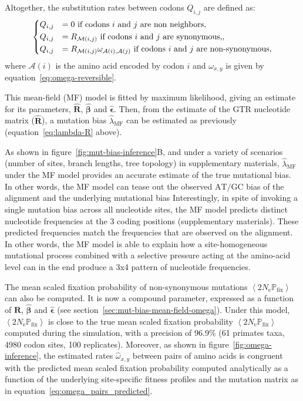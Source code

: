 \documentclass{article}
\newcommand{\UniDimArray}[1]{\bm{#1}}
\newcommand{\BiDimArray}[1]{\bm{#1}}
\newcommand{\Ne}{N_{\text{e}}}
\newcommand{\proba}{\mathbb{P}}
\newcommand{\Pfix}{2 \Ne \proba_{\text{fix}}}
\newcommand{\atgc}{\text{AT/GC}}
\newcommand{\mutmatrix}{R}
\newcommand{\Mutmatrix}{\BiDimArray{\mutmatrix}}
\newcommand{\ci}{{i}}
\newcommand{\cj}{{j}}
\newcommand{\itoj}{\ci, \cj}
\newcommand{\nuc}{\mathcal{M}}
\newcommand{\nucitoj}{\nuc(\itoj)}
\newcommand{\submatrix}{Q}
\newcommand{\aaSource}{x}
\newcommand{\aaTarget}{y}
\newcommand{\aaMap}{\mathcal{A}}
\newcommand{\aai}{\aaMap(\ci)}
\newcommand{\aaj}{\aaMap(\cj)}
\newcommand{\avgpfix}{\left\langle \Pfix \right\rangle }
\newcommand{\AAexchan}{\beta}
\newcommand{\AAExchan}{\UniDimArray{\AAexchan}}
\newcommand{\AAequi}{\epsilon}
\newcommand{\AAEqui}{\UniDimArray{\AAequi}}
\begin{document}
Altogether, the {substitution} rates between codons $\submatrix_{\itoj}$ are defined as:
\begin{equation}
 \begin{dcases}
 \submatrix_{\itoj} & = 0 \text{ if codons $\ci$ and $\cj$ are non neighbors}, \\
 \submatrix_{\itoj} & = \mutmatrix_{\nucitoj} \text{ if codons $\ci$ and $\cj$ are {synonymous},}, \\
 \submatrix_{\itoj} & = \mutmatrix_{\nucitoj} \omega_{\aai, \aaj} \text{ if codons $\ci$ and $\cj$ are non-synonymous},
 \end{dcases}
 \label{eq:codon-mean-field}
\end{equation}
where $\aai$ is the amino acid encoded by codon $\ci$ and $\omega_{\aaSource, \aaTarget}$ is given by equation~\ref{eq:omega-reversible}.

This mean-field ({MF}) model is fitted by maximum {likelihood}, giving an estimate for its parameters, $\widehat{\Mutmatrix}$, $\widehat{\AAExchan}$ and $\widehat{\AAEqui}$.
Then, from the estimate of the {GTR} nucleotide matrix ($\widehat{\Mutmatrix}$), a mutation bias $\widehat{\lambda}_{\text{{MF}}}$ can be estimated as previously (equation~\ref{eq:lambda-R} above).

As shown in figure~\ref{fig:mut-bias-inference}B, and under a variety of scenarios (number of sites, branch lengths, tree topology) in supplementary materials, $\widehat{\lambda}_{\text{{MF}}}$ under the {MF} model provides an accurate estimate of the true mutational bias.
In other words, the {MF} model can tease out the observed $\atgc$ bias of the alignment and the underlying mutational bias
Interestingly, in spite of invoking a single mutation bias across all nucleotide sites, the MF model predicts distinct nucleotide frequencies at the 3 coding positions (supplementary materials).
These predicted frequencies match the frequencies that are observed on the alignment.
In other words, the MF model is able to explain how a site-homogeneous mutational process combined with a selective pressure acting at the amino-acid level can in the end produce a 3x4 pattern of nucleotide frequencies.

The mean scaled fixation probability of {non-synonymous} mutations $\avgpfix$ can also be computed.
It is now a compound parameter, expressed as a function of $\widehat{\Mutmatrix}$, $\widehat{\AAExchan}$ and $\widehat{\AAEqui}$ (see section~\ref{sec:mut-bias-mean-field-omega}).
Under this model, $\avgpfix$ is close to the true mean scaled fixation probability $\avgpfix$ computed during the simulation, with a precision of 96.9\% (61 primates taxa, 4980 codon sites, 100 replicates).
Moreover, as shown in figure~\ref{fig:omega-inference}, the estimated rates $\widehat{\omega}_{\aaSource, \aaTarget}$ between pairs of amino acids is congruent with the predicted mean scaled fixation probability computed analytically as a function of the underlying site-specific fitness profiles and the mutation matrix as in equation~\ref{eq:omega_pairs_predicted}.
\end{document}
